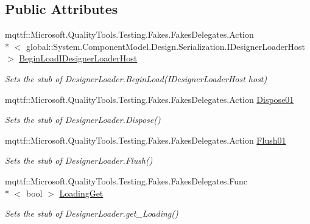 \subsection*{Public Attributes}
\begin{DoxyCompactItemize}
\item 
mqttf\-::\-Microsoft.\-Quality\-Tools.\-Testing.\-Fakes.\-Fakes\-Delegates.\-Action\\*
$<$ global\-::\-System.\-Component\-Model.\-Design.\-Serialization.\-I\-Designer\-Loader\-Host $>$ \hyperlink{class_system_1_1_component_model_1_1_design_1_1_serialization_1_1_fakes_1_1_stub_designer_loader_ae2f9f9f67a35ec1e5d9275e2bf31d401}{Begin\-Load\-I\-Designer\-Loader\-Host}
\begin{DoxyCompactList}\small\item\em Sets the stub of Designer\-Loader.\-Begin\-Load(\-I\-Designer\-Loader\-Host host)\end{DoxyCompactList}\item 
mqttf\-::\-Microsoft.\-Quality\-Tools.\-Testing.\-Fakes.\-Fakes\-Delegates.\-Action \hyperlink{class_system_1_1_component_model_1_1_design_1_1_serialization_1_1_fakes_1_1_stub_designer_loader_ac036bb8ab81e77a972a9571c8d04a844}{Dispose01}
\begin{DoxyCompactList}\small\item\em Sets the stub of Designer\-Loader.\-Dispose()\end{DoxyCompactList}\item 
mqttf\-::\-Microsoft.\-Quality\-Tools.\-Testing.\-Fakes.\-Fakes\-Delegates.\-Action \hyperlink{class_system_1_1_component_model_1_1_design_1_1_serialization_1_1_fakes_1_1_stub_designer_loader_afda96122fcc54b923ad308c06bd3d3db}{Flush01}
\begin{DoxyCompactList}\small\item\em Sets the stub of Designer\-Loader.\-Flush()\end{DoxyCompactList}\item 
mqttf\-::\-Microsoft.\-Quality\-Tools.\-Testing.\-Fakes.\-Fakes\-Delegates.\-Func\\*
$<$ bool $>$ \hyperlink{class_system_1_1_component_model_1_1_design_1_1_serialization_1_1_fakes_1_1_stub_designer_loader_a0bd56e0f01f25fce05c5d74774d6ba74}{Loading\-Get}
\begin{DoxyCompactList}\small\item\em Sets the stub of Designer\-Loader.\-get\-\_\-\-Loading()\end{DoxyCompactList}\end{DoxyCompactItemize}
